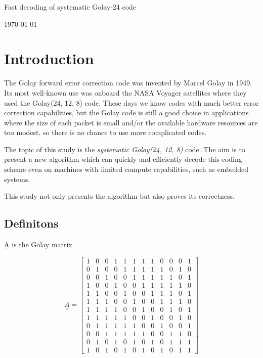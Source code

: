 \documentclass[11pt,a4paper,oneside]{report}             %
\def\doubleunderline#1{\underline{\underline{#1}}}
\begin{document}
\begin{titlepage}
\begin{center}
{\huge Fast decoding of systematic Golay-24 code } 
\vspace{0.5cm}

\vfill
{\large \today}
\end{center}
\end{titlepage}

\chapter{Introduction}

The Golay forward error correction code was invented by Marcel Golay in 1949. Its most well-known
use was onboard the NASA Voyager satellites where they used the Golay(24, 12, 8) code. These days
we know codes with much better error correction capabilities, but the Golay code is still a good
choice in applications where the size of each packet is small and/or the available hardware
resources are too modest, so there is no chance to use more complicated codes.

The topic of this study is the \emph{systematic Golay(24, 12, 8)} code. The aim is to present a
new algorithm which can quickly and efficiently decode this coding scheme even on machines with
limited compute capabilities, such as embedded systems.

This study not only presents the algorithm but also proves its correctness.

\section{Definitons}

\doubleunderline{A} is the Golay matrix.

\[
    \doubleunderline{A} = 
    \begin{bmatrix}
            1 & 0 & 0 & 1 & 1 & 1 & 1 & 1 & 0 & 0 & 0 & 1 \\
            0 & 1 & 0 & 0 & 1 & 1 & 1 & 1 & 1 & 0 & 1 & 0 \\
            0 & 0 & 1 & 0 & 0 & 1 & 1 & 1 & 1 & 1 & 0 & 1 \\
            1 & 0 & 0 & 1 & 0 & 0 & 1 & 1 & 1 & 1 & 1 & 0 \\
            1 & 1 & 0 & 0 & 1 & 0 & 0 & 1 & 1 & 1 & 0 & 1 \\
            1 & 1 & 1 & 0 & 0 & 1 & 0 & 0 & 1 & 1 & 1 & 0 \\
            1 & 1 & 1 & 1 & 0 & 0 & 1 & 0 & 0 & 1 & 0 & 1 \\
            1 & 1 & 1 & 1 & 1 & 0 & 0 & 1 & 0 & 0 & 1 & 0 \\
            0 & 1 & 1 & 1 & 1 & 1 & 0 & 0 & 1 & 0 & 0 & 1 \\
            0 & 0 & 1 & 1 & 1 & 1 & 1 & 0 & 0 & 1 & 1 & 0 \\
            0 & 1 & 0 & 1 & 0 & 1 & 0 & 1 & 0 & 1 & 1 & 1 \\
            1 & 0 & 1 & 0 & 1 & 0 & 1 & 0 & 1 & 0 & 1 & 1
    \end{bmatrix}
\]
\end{document}

